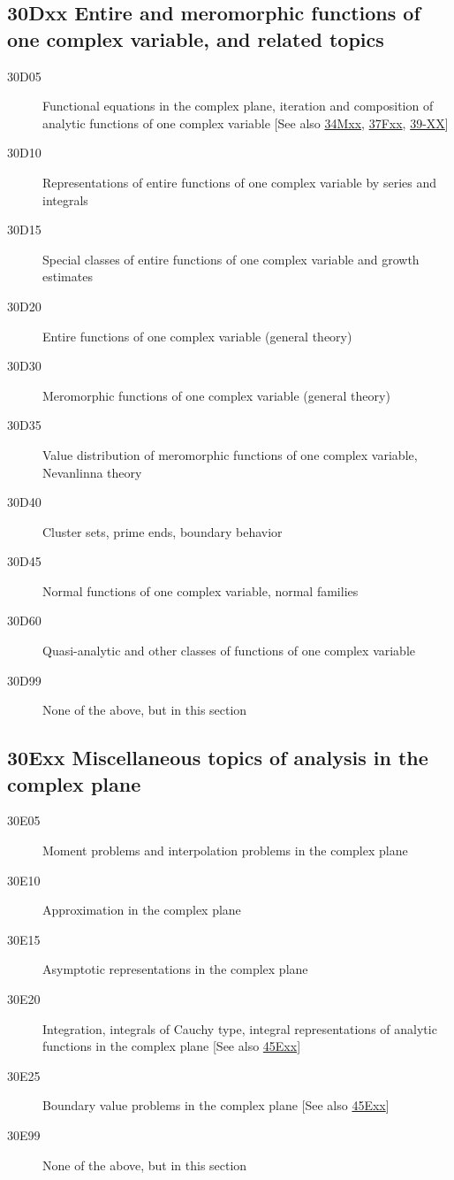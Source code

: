 \subsection*{30Dxx  Entire and meromorphic functions of one complex variable, and related topics }\label{30Dxx}
\begin{description}  
\item [30D05]\label{30D05} Functional equations in the complex plane, iteration and composition of analytic functions of one complex variable [See also \hyperref[34Mxx]{34Mxx}, \hyperref[37Fxx]{37Fxx}, \hyperref[39-XX]{39-XX}]
\item [30D10]\label{30D10} Representations of entire functions of one complex variable by series and integrals
\item [30D15]\label{30D15} Special classes of entire functions of one complex variable and growth estimates
\item [30D20]\label{30D20} Entire functions of one complex variable (general theory)
\item [30D30]\label{30D30} Meromorphic functions of one complex variable (general theory)
\item [30D35]\label{30D35} Value distribution of meromorphic functions of one complex variable, Nevanlinna theory
\item [30D40]\label{30D40} Cluster sets, prime ends, boundary behavior
\item [30D45]\label{30D45} Normal functions of one complex variable, normal families
\item [30D60]\label{30D60} Quasi-analytic and other classes of functions of one complex variable
\item [30D99]\label{30D99} None of the above, but in this section
\end{description}
\subsection*{30Exx  Miscellaneous topics of analysis in the complex plane}\label{30Exx}
\begin{description}  
\item [30E05]\label{30E05} Moment problems and interpolation problems in the complex plane
\item [30E10]\label{30E10} Approximation in the complex plane
\item [30E15]\label{30E15} Asymptotic representations in the complex plane 
\item [30E20]\label{30E20} Integration, integrals of Cauchy type, integral representations of analytic functions in the complex plane [See also \hyperref[45Exx]{45Exx}]
\item [30E25]\label{30E25} Boundary value problems in the complex plane [See also \hyperref[45Exx]{45Exx}]
\item [30E99]\label{30E99} None of the above, but in this section
\end{description}
